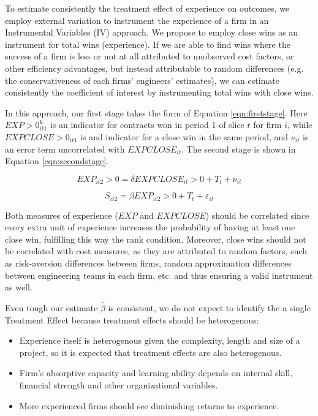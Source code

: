To estimate consistently the treatment effect of experience on outcomes, we employ external variation to instrument the experience of a firm in an Instrumental Variables (IV) approach. We propose to employ close wins as an instrument for total wins (experience). If we are able to find wins where the success of a firm is less or not at all attributed to unobserved cost factors, or other efficiency advantages, but instead attributable to random differences (e.g. the conservativeness of each firms' engineers' estimates), we can estimate consistently the coefficient of interest by instrumenting total wins with close wins.

In this approach, our first stage takes the form of Equation \ref{eqn:firststage}. Here $EXP>0_{it1}^k$ is an indicator for contracts won in period 1 of slice $t$ for firm $i$, while $EXPCLOSE>0_{it1}$ is and indicator for a close win in the same period, and $\nu_{it}$ is an error term uncorrelated with $EXPCLOSE_{it}$. The second stage is shown in Equation \ref{eqn:secondstage}.

\begin{equation}
\label{eqn:firststage}
EXP_{it2}>0= \delta EXPCLOSE_{it}>0+T_t+\nu_{it}
\end{equation}

\begin{equation}
\label{eqn:secondstage}
S_{it2}= \beta EXP_{it2}>0+T_t+\varepsilon_{it}
\end{equation}

Both measures of experience ($EXP$ and $EXPCLOSE$) should be correlated since every extra unit of experience increases the probability of having at least one close win, fulfilling this way the rank condition. Moreover, close wins should not be correlated with cost measures, as they are attributed to random factors, such as risk-aversion differences between firms, random approximation differences between engineering teams in each firm, etc. and thus ensuring a valid instrument as well.

Even tough our estimate $\hat{\beta}$ is consistent,
we do not expect to identify the a single Treatment Effect because treatment effects should be heterogenous:
\begin{itemize}[itemsep=1pt]
  \item Experience itself is heterogenous given the complexity, length and size of a project, so it is expected that treatment effects are also heterogenous.
  \item Firm's absorptive capacity and learning ability depends on internal skill, financial strength and other organizational variables.
  \item More experienced firms should see diminishing returns to experience.
  \end{itemize}

